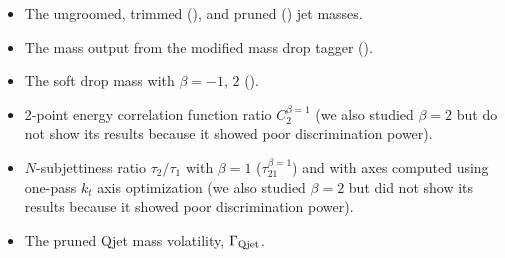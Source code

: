\begin{itemize}
\item The ungroomed, trimmed (\mtrim), and pruned (\mprun) jet masses.
\item The mass output from the modified mass drop tagger (\mmdt).
\item The soft drop mass with $\beta=-1,\,2$ (\msd).
\item 2-point energy correlation function ratio $C_2^{\beta=1}$  (we also studied $\beta=2$ but do not show its results because it showed poor discrimination power).
\item $N$-subjettiness ratio $\tau_2 / \tau_1$ with $\beta=1$ ($\tau_{21}^{\beta=1}$) and with axes computed using one-pass $k_t$ axis optimization (we also studied $\beta=2$ but did not show its results because it showed poor discrimination power).
\item The pruned Qjet mass volatility, $\Gamma_{\rm Qjet}$.
\end{itemize}

